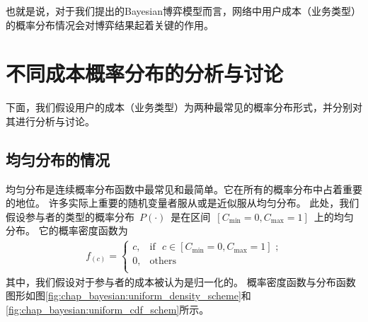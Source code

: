 也就是说，对于我们提出的Bayesian博弈模型而言，网络中用户成本（业务类型）的概率分布情况会对博弈结果起着关键的作用。
\section{不同成本概率分布的分析与讨论}
下面，我们假设用户的成本（业务类型）为两种最常见的概率分布形式，并分别对其进行分析与讨论。
\subsection{均匀分布的情况}
均匀分布是连续概率分布函数中最常见和最简单。它在所有的概率分布中占着重要的地位。
许多实际上重要的随机变量者服从或是近似服从均匀分布。
此处，我们假设参与者的类型的概率分布~$P(\cdot)$~是在区间~$[C_{\min}=0, C_{\max}=1]$~上的均匀分布。
它的概率密度函数为
\begin{align}
    f_(c) = \begin{cases} c, &\text{if ~$c \in [C_{\min}=0, C_{\max}=1]$~;}\\
        0, &\text{others}\\ 
    \end{cases} 
    \label{eqn_equilibrium_prob} 
\end{align}
其中，我们假设对于参与者的成本被认为是归一化的。
概率密度函数与分布函数图形如图\ref{fig:chap_bayesian:uniform_density_scheme}和\ref{fig:chap_bayesian:uniform_cdf_schem}所示。
